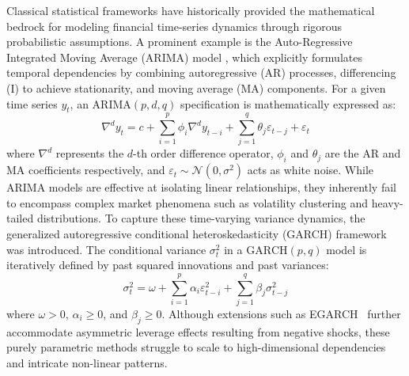 \documentclass[11pt,a4paper]{article}
\providecommand{\DIFaddbegin}{} %
\providecommand{\DIFaddend}{} %
\providecommand{\DIFdelbegin}{} %
\providecommand{\DIFdelend}{} %
\providecommand{\DIFscaledelfig}{0.5}
\newlength{\DIFdelgraphicswidth} %
\newlength{\DIFdelgraphicsheight} %
\providecommand{\DIFaddincludegraphics}[2][]{{\color{blue}\fbox{\DIFOincludegraphics[#1]{#2}}}} %
\providecommand{\DIFdelincludegraphics}[2][]{%
\sbox{\DIFdelgraphicsbox}{\DIFOincludegraphics[#1]{#2}}%
\settoboxwidth{\DIFdelgraphicswidth}{\DIFdelgraphicsbox} %
\settoboxtotalheight{\DIFdelgraphicsheight}{\DIFdelgraphicsbox} %
\scalebox{\DIFscaledelfig}{%
\parbox[b]{\DIFdelgraphicswidth}{\usebox{\DIFdelgraphicsbox}\\[-\baselineskip] \rule{\DIFdelgraphicswidth}{0em}}\llap{\resizebox{\DIFdelgraphicswidth}{\DIFdelgraphicsheight}{%
\setlength{\unitlength}{\DIFdelgraphicswidth}%
\begin{picture}(1,1)%
\thicklines\linethickness{2pt} %
{\color[rgb]{1,0,0}\put(0,0){\framebox(1,1){}}}%
{\color[rgb]{1,0,0}\put(0,0){\line( 1,1){1}}}%
{\color[rgb]{1,0,0}\put(0,1){\line(1,-1){1}}}%
\end{picture}%
}\hspace*{3pt}}} %
} %
\DeclareRobustCommand{\DIFaddbegin}{\DIFOaddbegin \let\includegraphics\DIFaddincludegraphics} %
\DeclareRobustCommand{\DIFaddend}{\DIFOaddend \let\includegraphics\DIFOincludegraphics} %
\DeclareRobustCommand{\DIFdelbegin}{\DIFOdelbegin \let\includegraphics\DIFdelincludegraphics} %
\DeclareRobustCommand{\DIFdelend}{\DIFOaddend \let\includegraphics\DIFOincludegraphics} %
\begin{document}
Classical statistical frameworks have historically provided the mathematical bedrock for modeling financial time-series dynamics through rigorous probabilistic assumptions. A prominent example is the Auto-Regressive Integrated Moving Average (ARIMA) model \DIFdelbegin %
\DIFdelend \DIFaddbegin \citep{box2015time}\DIFaddend , which explicitly formulates temporal dependencies by combining autoregressive (AR) processes, differencing (I) to achieve stationarity, and moving average (MA) components. For a given time series $y_t$, an $\text{ARIMA}(p, d, q)$ specification is mathematically expressed as:
\begin{equation}
\nabla^d y_t = c + \sum_{i=1}^p \phi_i \nabla^d y_{t-i} + \sum_{j=1}^q \theta_j \varepsilon_{t-j} + \varepsilon_t
\end{equation}
where $\nabla^d$ represents the $d$-th order difference operator, $\phi_i$ and $\theta_j$ are the AR and MA coefficients respectively, and $\varepsilon_t \sim \mathcal{N}(0, \sigma^2)$ acts as white noise. While ARIMA models are effective at isolating linear relationships, they inherently fail to encompass complex market phenomena such as volatility clustering and heavy-tailed distributions. To capture these time-varying variance dynamics, the generalized autoregressive conditional heteroskedasticity (GARCH) framework~\citep{bollerslev1986garch} was introduced. The conditional variance $\sigma_t^2$ in a $\text{GARCH}(p, q)$ model is iteratively defined by past squared innovations and past variances:
\begin{equation}
\sigma_t^2 = \omega + \sum_{i=1}^p \alpha_i \varepsilon_{t-i}^2 + \sum_{j=1}^q \beta_j \sigma_{t-j}^2
\end{equation}
where $\omega > 0$, $\alpha_i \ge 0$, and $\beta_j \ge 0$. Although extensions such as EGARCH~\citep{nelson1991egarch} further accommodate asymmetric leverage effects resulting from negative shocks, these purely parametric methods struggle to scale to high-dimensional dependencies and intricate non-linear patterns.
\end{document}
